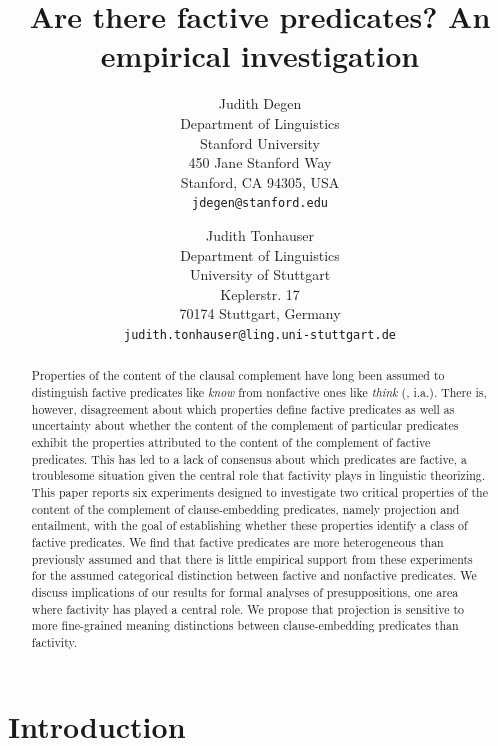 \documentclass{language}
\title{Are there factive predicates? An empirical investigation}
\author{Judith Degen\\Department of Linguistics\\Stanford University\\
450 Jane Stanford Way \\
Stanford, CA 94305, USA\\ {\tt jdegen@stanford.edu}
\and
 Judith Tonhauser\\Department of Linguistics\\
University of Stuttgart \\
Keplerstr. 17 \\ 
70174 Stuttgart, Germany \\ {\tt judith.tonhauser@ling.uni-stuttgart.de}}
\date{}
\newcommand{\6}{\mbox{$[\hspace*{-.6mm}[$}}
\newcommand{\9}{\mbox{$]\hspace*{-.6mm}]$}}
\begin{document}

\maketitle

\begin{abstract}
\noindent\normalsize
Properties of the content of the clausal complement have long been assumed to distinguish factive predicates like {\em know} from nonfactive ones like {\em think} (\citealt{kiparsky-kiparsky70}, i.a.). There is, however, disagreement about which properties define factive predicates as well as uncertainty about whether the content of the complement of particular predicates exhibit the properties attributed to the content of the complement of factive predicates. This has led to a lack of consensus about which predicates are factive, a troublesome situation given the central role that factivity plays in linguistic theorizing. This paper reports six experiments designed to investigate two critical properties of the content of the complement of clause-embedding predicates, namely projection and entailment, with the goal of establishing whether these properties identify a class of factive predicates. We find that factive predicates are more heterogeneous than previously assumed and that there is little empirical support from these experiments for the assumed categorical distinction between factive and nonfactive predicates. We discuss implications of our results for formal analyses of presuppositions, one area where factivity has played a central role. We propose that projection is sensitive to more fine-grained meaning distinctions between clause-embedding predicates than factivity.


\end{abstract}
		
\section{Introduction}\label{s1}
\end{document}
